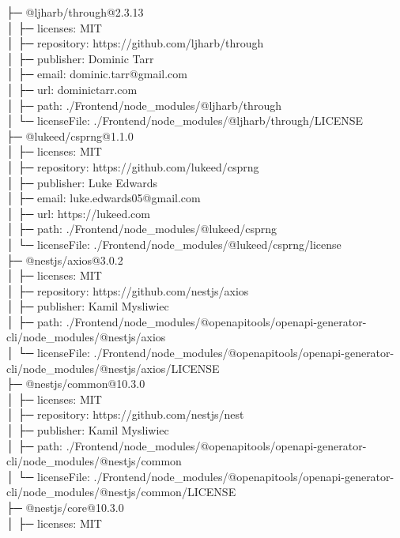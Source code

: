 ├─ @ljharb/through@2.3.13\\
│  ├─ licenses: MIT\\
│  ├─ repository: https://github.com/ljharb/through\\
│  ├─ publisher: Dominic Tarr\\
│  ├─ email: dominic.tarr@gmail.com\\
│  ├─ url: dominictarr.com\\
│  ├─ path: ./Frontend/node\_modules/@ljharb/through\\
│  └─ licenseFile: ./Frontend/node\_modules/@ljharb/through/LICENSE\\
├─ @lukeed/csprng@1.1.0\\
│  ├─ licenses: MIT\\
│  ├─ repository: https://github.com/lukeed/csprng\\
│  ├─ publisher: Luke Edwards\\
│  ├─ email: luke.edwards05@gmail.com\\
│  ├─ url: https://lukeed.com\\
│  ├─ path: ./Frontend/node\_modules/@lukeed/csprng\\
│  └─ licenseFile: ./Frontend/node\_modules/@lukeed/csprng/license\\
├─ @nestjs/axios@3.0.2\\
│  ├─ licenses: MIT\\
│  ├─ repository: https://github.com/nestjs/axios\\
│  ├─ publisher: Kamil Mysliwiec\\
│  ├─ path: ./Frontend/node\_modules/@openapitools/openapi-generator-cli/node\_modules/@nestjs/axios\\
│  └─ licenseFile: ./Frontend/node\_modules/@openapitools/openapi-generator-cli/node\_modules/@nestjs/axios/LICENSE\\
├─ @nestjs/common@10.3.0\\
│  ├─ licenses: MIT\\
│  ├─ repository: https://github.com/nestjs/nest\\
│  ├─ publisher: Kamil Mysliwiec\\
│  ├─ path: ./Frontend/node\_modules/@openapitools/openapi-generator-cli/node\_modules/@nestjs/common\\
│  └─ licenseFile: ./Frontend/node\_modules/@openapitools/openapi-generator-cli/node\_modules/@nestjs/common/LICENSE\\
├─ @nestjs/core@10.3.0\\
│  ├─ licenses: MIT\\

